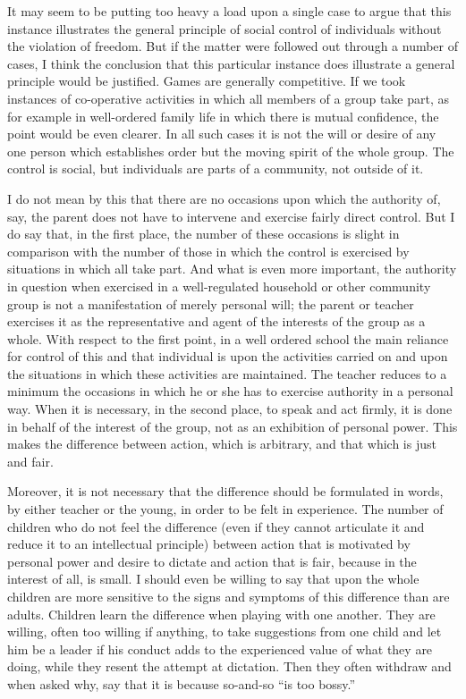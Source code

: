 It may seem to be putting too heavy a load upon a single case to argue that this 
instance illustrates the general principle of social control of individuals without the 
violation of freedom. But if the matter were followed out through a number of cases, I 
think the conclusion that this particular instance does illustrate a general principle would 
be justified. Games are generally competitive. If we took instances of co-operative 
activities in which all members of a group take part, as for example in well-ordered 
family life in which there is mutual confidence, the point would be even clearer. In all 
such cases it is not the will or desire of any one person which establishes order but the 
moving spirit of the whole group. The control is social, but individuals are parts of a 
community, not outside of it. 

I do not mean by this that there are no occasions upon which the authority of, say, the 
parent does not have to intervene and exercise fairly direct control. But I do say that, in the first place, the number of these occasions is slight in comparison with the number of 
those in which the control is exercised by situations in which all take part. And what is 
even more important, the authority in question when exercised in a well-regulated 
household or other community group is not a manifestation of merely personal will; the 
parent or teacher exercises it as the representative and agent of the interests of the group 
as a whole. With respect to the first point, in a well ordered school the main reliance for 
control of this and that individual is upon the activities carried on and upon the situations 
in which these activities are maintained. The teacher reduces to a minimum the occasions 
in which he or she has to exercise authority in a personal way. When it is necessary, in 
the second place, to speak and act firmly, it is done in behalf of the interest of the group, 
not as an exhibition of personal power. This makes the difference between action, which 
is arbitrary, and that which is just and fair. 

Moreover, it is not necessary that the difference should be formulated in words, by 
either teacher or the young, in order to be felt in experience. The number of children who 
do not feel the difference (even if they cannot articulate it and reduce it to an intellectual 
principle) between action that is motivated by personal power and desire to dictate and 
action that is fair, because in the interest of all, is small. I should even be willing to say 
that upon the whole children are more sensitive to the signs and symptoms of this 
difference than are adults. Children learn the difference when playing with one another. 
They are willing, often too willing if anything, to take suggestions from one child and let 
him be a leader if his conduct adds to the experienced value of what they are doing, while 
they resent the attempt at dictation. Then they often withdraw and when asked why, say 
that it is because so-and-so \enquote{is too bossy.} 

